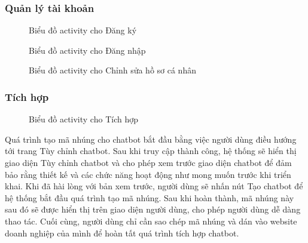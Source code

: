 \subsubsection{Quản lý tài khoản}
\begin{figure}[H]
    \centering
     
    \vspace{0.5cm}
    \caption{Biểu đồ activity cho Đăng ký}
    \label{fig:enter-label}
\end{figure}
\begin{figure}[H]
    \centering
     
    \vspace{0.5cm}
    \caption{Biểu đồ activity cho Đăng nhập}
    \label{fig:enter-label}
\end{figure}
\begin{figure}[H]
    \centering
     
    \vspace{0.5cm}
    \caption{Biểu đồ activity cho Chỉnh sửa hồ sơ cá nhân}
    \label{fig:enter-label}
\end{figure}


\subsubsection{Tích hợp}
\begin{figure}[H]
    \centering
     
    \vspace{0.5cm}
    \caption{Biểu đồ activity cho Tích hợp}
    \label{fig:enter-label}
\end{figure}

\par Quá trình tạo mã nhúng cho chatbot bắt đầu bằng việc người dùng điều hướng tới trang Tùy chỉnh chatbot. Sau khi truy cập thành công, hệ thống sẽ hiển thị giao diện Tùy chỉnh chatbot và cho phép xem trước giao diện chatbot để đảm bảo rằng thiết kế và các chức năng hoạt động như mong muốn trước khi triển khai. Khi đã hài lòng với bản xem trước, người dùng sẽ nhấn nút Tạo chatbot để hệ thống bắt đầu quá trình tạo mã nhúng. Sau khi hoàn thành, mã nhúng này sau đó sẽ được hiển thị trên giao diện người dùng, cho phép người dùng dễ dàng thao tác. Cuối cùng, người dùng chỉ cần sao chép mã nhúng và dán vào website doanh nghiệp của mình để hoàn tất quá trình tích hợp chatbot.

